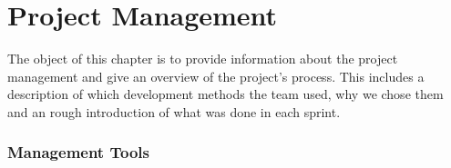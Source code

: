 \chapter{Project Management}
The object of this chapter is to provide information about the project management and give an overview of the project's process. This includes a description of which development methods the team used, why we chose them and an rough introduction of what was done in each sprint.
\newpage
{}
\subsection{Management Tools}





\newpage


\newpage
